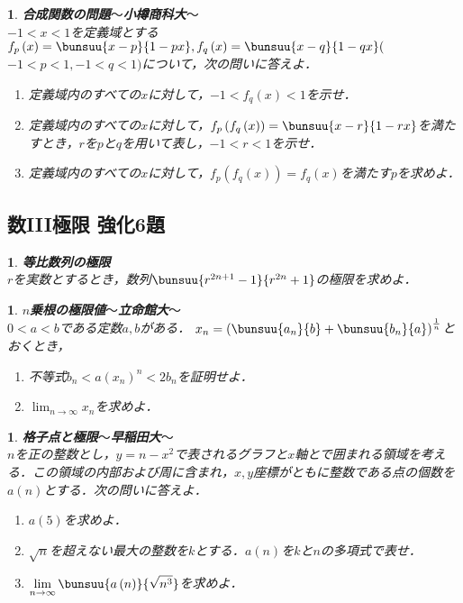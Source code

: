 \documentclass[10pt,
fleqn,
dvipdfmx,
uplatex
]{jsarticle}
\newtheorem{question}[Question]{}
\begin{document}
\begin{question}{\bf\boldmath 合成関数の問題$〜$小樽商科大$〜$}\\
$-1<x<1$を定義域とする$f_p\left(x\right)=\bunsuu{{x-p}}{{1-px}}, f_q\left(x\right)=\bunsuu{{x-q}}{{1-qx}}($
$-1<p<1,-1<q<1)$について，次の問いに答えよ．
\begin{enumerate}
\item 定義域内のすべての$x$に対して，$-1<f_q\left(x\right)<1$を示せ．
\item 定義域内のすべての$x$に対して，$f_p\left(f_q\left(x\right)\right)=\bunsuu{{x-r}}{{1-rx}}$を満たすとき，$r$を$p$と$q$を用いて表し，$-1<r<1$を示せ．
\item 定義域内のすべての$x$に対して，$f_p\left(f_q\left(x\right)\right)=f_q\left(x\right)$を満たす$p$を求めよ．
\end{enumerate}

\end{question}

\subsection{数III極限 強化6題}



\begin{question}{\bf\boldmath 等比数列の極限}\\
$r$を実数とするとき，数列$\bunsuu{{r^{2n+1}-1}}{{r^{2n}+1}}$の極限を求めよ．
\end{question}



\begin{question}{\bf\boldmath $n$乗根の極限値$〜$立命館大$〜$}\\
$0<a<b$である定数$a, b$がある．
$x_n=\left(\bunsuu{{a_n}}{b}+\bunsuu{{b_n}}{a}\right)^{\frac{1}{n}}$とおくとき，
\begin{enumerate}
\item 不等式$b_n<a\left(x_n\right)^n<2b_n$を証明せよ．
\item $\displaystyle\lim_{n\to \infty }x_n$を求めよ．
\end{enumerate}

\end{question}



\begin{question}{\bf\boldmath 格子点と極限$〜$早稲田大$〜$}\\
$n$を正の整数とし，$y=n-x^2$で表されるグラフと$x$軸とで囲まれる領域を考える．この領域の内部および周に含まれ，$x, y$座標がともに整数である点の個数を$a\left(n\right)$とする．次の問いに答えよ．
\begin{enumerate}
\item $a\left(5\right)$を求めよ．
\item $\sqrt n$を超えない最大の整数を$k$とする．$a\left(n\right)$を$k$と$n$の多項式で表せ．
\item $\displaystyle\lim_{n\to \infty }\bunsuu{{a\left(n\right)}}{{\sqrt {n^3}}}$を求めよ．
\end{enumerate}

\end{question}
\end{document}
